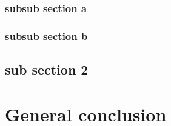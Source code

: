 \documentclass[11pt]{article}
\begin{document}
			\subsubsection{subsub section a}
			\subsubsection{subsub section b}
		\subsection{sub section 2}
	\newpage
	
	\section{General conclusion}
	\newpage
	
	\nocite{*}
	
	
\end{document}
